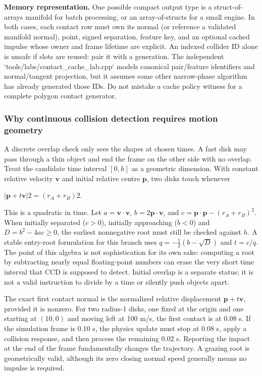 \textbf{Memory representation.} One possible compact output type is a struct-of-arrays manifold for batch processing, or an array-of-structs for a small engine. In both cases, each contact row must own its normal (or reference a validated manifold normal), point, signed separation, feature key, and an optional cached impulse whose owner and frame lifetime are explicit. An indexed collider ID alone is unsafe if slots are reused: pair it with a generation. The independent `tools/labs/contact\_cache\_lab.cpp` models canonical pair/feature identifiers and normal/tangent projection, but it assumes some other narrow-phase algorithm has already generated those IDs. Do not mistake a cache policy witness for a complete polygon contact generator.

\subsubsection{Why continuous collision detection requires motion geometry}\label{04-visual-computing-ii-ch026-why-continuous-collision-detection-requires-motion-geometry}

\hypertarget{04-visual-computing-ii-ch026-why-continuous-collision-detection-requires-motion-geometry}{}

A discrete overlap check only sees the shapes at chosen times. A fast disk may pass through a thin object and end the frame on the other side with no overlap. Treat the candidate time interval \([0,h]\) as a geometric dimension. With constant relative velocity \(\mathbf v\) and initial relative centre \(\mathbf p\), two disks touch whenever

\(|\mathbf p+t\mathbf v|2=(r_A+r_B)2.\)

This is a quadratic in time. Let \(a=\mathbf v\cdot\mathbf v\), \(b=2\mathbf p\cdot\mathbf v\), and \(c=\mathbf p\cdot\mathbf p-(r_A+r_B)^2\). When initially separated (\(c>0\)), initially approaching (\(b<0\)) and \(D=b^2-4ac\ge0\), the earliest nonnegative root must still be checked against \(h\). A stable entry-root formulation for this branch uses \(q=-\frac12(b-\sqrt D)\) and \(t=c/q\). The point of this algebra is not sophistication for its own sake: computing a root by subtracting nearly equal floating-point numbers can erase the very short time interval that CCD is supposed to detect. Initial overlap is a separate status; it is not a valid instruction to divide by a time or silently push objects apart.

The exact first contact normal is the normalized relative displacement \(\mathbf p+t\mathbf v\), provided it is nonzero. For two radius-1 disks, one fixed at the origin and one starting at \((10,0)\) and moving left at 100 m/s, the first contact is at 0.08 s. If the simulation frame is 0.10 s, the physics update must stop at 0.08 s, apply a collision response, and then process the remaining 0.02 s. Reporting the impact at the end of the frame fundamentally changes the trajectory. A grazing root is geometrically valid, although its zero closing normal speed generally means no impulse is required.

